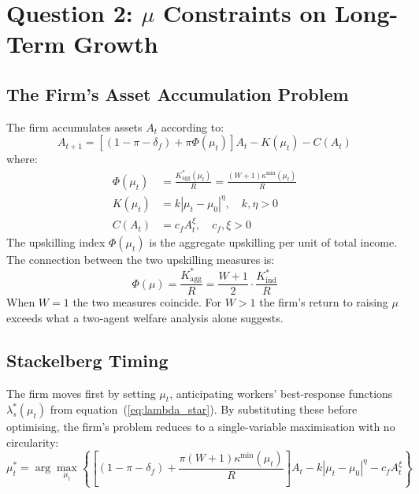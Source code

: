 \documentclass[12pt,a4paper]{article}
\begin{document}
\section{Question 2: $\mu$ Constraints on Long-Term Growth}
\label{sec:firm}

\subsection{The Firm's Asset Accumulation Problem}

The firm accumulates assets $A_t$ according to:
\begin{equation}
  A_{t+1} = \left[(1-\pi-\delta_f) + \pi\Phi(\mu_t)\right]A_t
             - K(\mu_t) - C(A_t)
  \label{eq:firm_lom}
\end{equation}
where:
\begin{align}
  \Phi(\mu_t) &= \frac{K^*_{\mathrm{agg}}(\mu_t)}{R}
               = \frac{(W+1)\kappa^{\min}(\mu_t)}{R}
  \label{eq:Phi} \\[4pt]
  K(\mu_t) &= k|\mu_t - \mu_0|^\eta, \quad k,\eta > 0
  \label{eq:Kcost} \\[4pt]
  C(A_t) &= c_f A_t^\xi, \quad c_f, \xi > 0
  \label{eq:Ccost}
\end{align}
The upskilling index $\Phi(\mu_t)$ is the aggregate upskilling per unit
of total income. The connection between the two upskilling measures is:
\begin{equation}
  \Phi(\mu) = \frac{K^*_{\mathrm{agg}}}{R}
  = \frac{W+1}{2}\cdot\frac{K^*_{\mathrm{ind}}}{R}
  \label{eq:Phi_two_levels}
\end{equation}
When $W=1$ the two measures coincide. For $W>1$ the firm's return to
raising $\mu$ exceeds what a two-agent welfare analysis alone suggests.

\subsection{Stackelberg Timing}

The firm moves first by setting $\mu_t$, anticipating workers'
best-response functions $\lambda_s^*(\mu_t)$ from
equation~(\ref{eq:lambda_star}). By substituting these before
optimising, the firm's problem reduces to a single-variable
maximisation with no circularity:
\begin{equation}
  \mu_t^* = \arg\max_{\mu_t}\left\{
    \left[(1-\pi-\delta_f)
    + \frac{\pi(W+1)\kappa^{\min}(\mu_t)}{R}\right]A_t
    - k|\mu_t-\mu_0|^\eta - c_f A_t^\xi
  \right\}
  \label{eq:firm_opt}
\end{equation}
\end{document}
